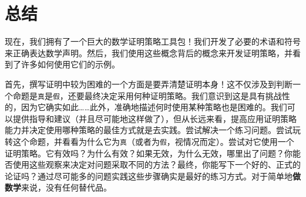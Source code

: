 \section{总结}

现在，我们拥有了一个巨大的数学证明策略工具包！我们开发了必要的术语和符号来正确表达数学声明。然后，我们使用这些概念背后的概念来开发证明策略，并看到了许多如何使用它们的示例。

首先，撰写证明中较为困难的一个方面是要弄清楚证明本身！这不仅涉及到判断一个命题是\verb|真|是\verb|假|，还要最终决定采用何种证明策略。我们意识到这是具有挑战性的，因为它确实如此……此外，准确地描述何时使用某种策略也是困难的。我们可以提供指导和建议（并且尽可能地这样做了），但从长远来看，提高应用证明策略能力并决定使用哪种策略的最佳方式就是去实践。尝试解决一个练习问题。尝试玩转这个命题，并看看为什么它为\verb|真|（或者为\verb|假|，视情况而定）。尝试对它使用一个证明策略。它有效吗？为什么有效？如果无效，为什么无效，哪里出了问题？你能否使用这些观察来决定对问题采取不同的方法？最终，你能写下一个好的、正式的论证吗？通过尽可能多的问题实践这些步骤确实是最好的练习方式。对于简单地\textbf{做数学}来说，没有任何替代品。